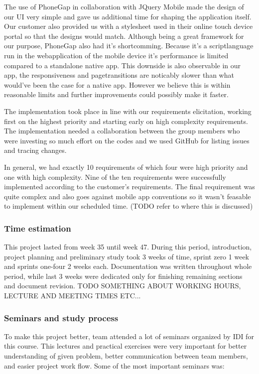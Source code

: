 The use of PhoneGap in collaboration with JQuery Mobile made the design of our UI very simple and gave us additional time for shaping the application itself. 
Our customer also provided us with a stylesheet used in their online touch device portal so that the designs would match.
Although being a great framework for our purpose, PhoneGap also had it's shortcomming.
Because it's a scriptlanguage run in the webapplication of the mobile device it's performance is limited compared to a standalone native app. 
This downside is also observable in our app, the responsiveness and pagetransitions are noticably slower than what would've been the case for a native app.
However we believe this is within reasonable limits and further improvements could possibly make it faster.

The implementation took place in line with our requirements elicitation, working first on the highest priority and starting early on high complexity requirements. 
The implementation needed a collaboration between the group members who were investing so much effort on the codes and we used GitHub for listing issues and tracing changes.

In general, we had exactly 10 requirements of which four were high priority and one with high complexity. 
Nine of the ten requirements were successfully implemented according to the customer's requirements.
The final requirement was quite complex and also goes against mobile app conventions so it wasn't feasable to implement within our scheduled time. (TODO refer to where this is discussed)

	\subsubsection{Time estimation}
	This project lasted from week 35 until week 47. During this period, introduction, project planning and preliminary study took 3 weeks of time, sprint zero 1 week and sprints one-four 2 weeks each. Documentation was written throughout whole period, while last 3 weeks were dedicated only for finishing remaining sections and document revision.\newline
	TODO SOMETHING ABOUT WORKING HOURS, LECTURE AND MEETING TIMES ETC...
	
	
	\subsubsection{Seminars and study process}
	To make this project better, team attended a lot of seminars organized by IDI for this course. This lectures and practical exercises were very important for better understanding of given problem, better communication between team members, and easier project work flow. Some of the most important seminars was:
	
